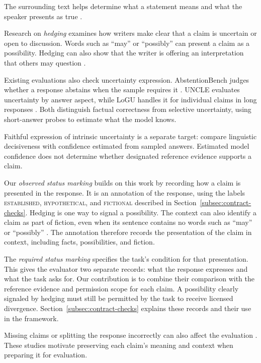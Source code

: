 \documentclass{clv2025}
\begin{document}
The surrounding text helps determine what a statement means and what the
speaker presents as true \citep{stalnaker_assertion_1978,clark_using_1996}.

Research on \emph{hedging} examines how writers make clear that a claim
is uncertain or open to discussion. Words such as ``may'' or ``possibly''
can present a claim as a possibility. Hedging can also show that the writer
is offering an interpretation that others may question
\citep{hyland_hedging_1996}.

Existing evaluations also check uncertainty expression.
AbstentionBench judges whether a response abstains when the sample requires it
\citep{kirichenko_abstentionbench_2025}. UNCLE evaluates uncertainty by answer
aspect, while LoGU handles it for individual claims in long responses
\citep{yang_uncle_2025,yang_logu_2025}. Both distinguish factual correctness
from selective uncertainty, using short-answer probes to estimate what the
model knows.

Faithful expression of intrinsic uncertainty is a separate target:
\citet{yona_faithful_2024} compare linguistic decisiveness with confidence
estimated from sampled answers. Estimated model confidence does not
determine whether designated reference evidence supports a claim.

Our \emph{observed status marking} builds on this work by recording how
a claim is presented in the response. It is an annotation of the response,
using the labels \textsc{established}, \textsc{hypothetical}, and
\textsc{fictional} described in Section~\ref{subsec:contract-checks}. Hedging is one
way to signal a possibility. The context can also identify a claim as
part of fiction, even when its sentence contains no words such as ``may''
or ``possibly'' \citep{searle_logical_1975}. The annotation therefore
records the presentation of the claim in context, including facts,
possibilities, and fiction.

The \emph{required status marking} specifies the task's condition for
that presentation. This gives the evaluator two separate records: what
the response expresses and what the task asks for. Our contribution is
to combine their comparison with the reference evidence and permission
scope for each claim. A possibility clearly signaled by hedging must
still be permitted by the task to receive licensed divergence.
Section~\ref{subsec:contract-checks} explains these records and their use in the
framework.

Missing claims or splitting the response incorrectly can also affect the
evaluation
\citep{wanner_closer_2024,metropolitansky_claimify_2025}.
These studies motivate preserving each claim's meaning and context when
preparing it for evaluation.
\end{document}
